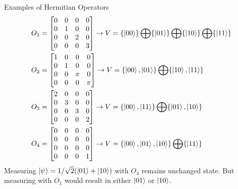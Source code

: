 \documentclass{beamer}
\begin{document}
\begin{frame}{Examples of Hermitian Operators}
  {\tiny
  \begin{align*}
    O_1 &= 
    \begin{bmatrix} 
      0 & 0 & 0 & 0 \\
      0 & 1 & 0 & 0 \\
      0 & 0 & 2 & 0 \\
      0 & 0 & 0 & 3
    \end{bmatrix}  \rightarrow
    V = \{\ket{00}\} \bigoplus \{\ket{01}\} \bigoplus \{\ket{10}\} \bigoplus \{\ket{11}\} \\
    O_2 &= 
    \begin{bmatrix} 
      1 & 0 & 0 & 0 \\
      0 & 1 & 0 & 0 \\
      0 & 0 & \pi & 0 \\
      0 & 0 & 0 & \pi 
    \end{bmatrix} \rightarrow
    V = \{\ket{00}, \ket{01}\} \bigoplus \{\ket{10}, \ket{11}\} \\
    O_3 &= 
    \begin{bmatrix} 
      2 & 0 & 0 & 0 \\
      0 & 3 & 0 & 0 \\
      0 & 0 & 3 & 0 \\
      0 & 0 & 0 & 2
    \end{bmatrix} \rightarrow
    V = \{\ket{00}, \ket{11}\} \bigoplus \{\ket{01}, \ket{10}\} \\
    O_4 &= 
    \begin{bmatrix} 
      0 & 0 & 0 & 0 \\
      0 & 0 & 0 & 0 \\
      0 & 0 & 0 & 0 \\
      0 & 0 & 0 & 1
    \end{bmatrix} \rightarrow
    V = \{\ket{00}, \ket{01}, \ket{10}\} \bigoplus \{\ket{11}\}
  \end{align*}
  Measuring $\ket{\psi} = 1/\sqrt2 (\ket{01}+\ket{10})$ with $O_4$ remains unchanged state.
  But measuring with $O_1$ would result in either $\ket{01}$ or $\ket{10}$.
  }%
\end{frame}
\end{document}

